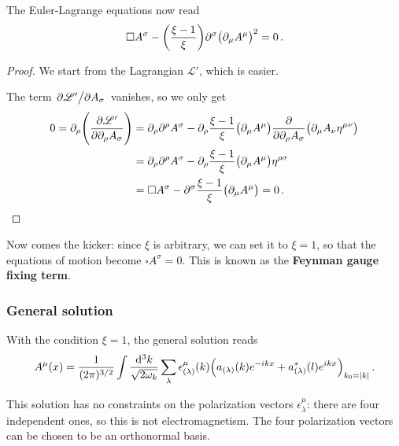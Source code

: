 \documentclass[main.tex]{subfiles}
\begin{document}
\begin{claim}
The Euler-Lagrange equations now read 
%
\begin{align}
\square A^{\sigma } - \qty(\frac{\xi -1}{\xi }) \partial^{\sigma }
\qty(\partial_{\mu } A^{ \mu })^2 = 0
\,.
\end{align}
\end{claim}

\begin{proof}
We start from the Lagrangian \(\mathscr{L}'\), which is easier. 

The term \(\pdv*{\mathscr{L}'}{A_{\sigma }}\) vanishes, so we only get 
%
\begin{align}
0=\partial_{\rho } \qty(\pdv{\mathscr{L}'}{\partial_{\rho } A_{\sigma }}) 
&= \partial_{\rho } \partial^{\rho } A^{\sigma } - \partial_{\rho } 
\frac{\xi - 1}{\xi } \qty(\partial_{\mu } A^{\mu }) \pdv{}{\partial_{\rho } A_{\sigma }} \qty(\partial_{\mu } A_{\nu } \eta^{\mu \nu })  \\
&= \partial_{\rho } \partial^{\rho } A^{\sigma } - \partial_{\rho } 
\frac{\xi - 1}{\xi } \qty(\partial_{\mu } A^{\mu }) \eta^{\rho \sigma }  \\
&= \square A^{\sigma } - \partial^{\sigma } 
\frac{\xi - 1}{\xi } \qty(\partial_{\mu } A^{\mu }) =0
\,. 
\end{align}
\end{proof}

Now comes the kicker: since \(\xi \) is arbitrary, we can set it to \(\xi = 1\), so that the equations of motion become \(\square A^{\sigma } = 0\). This is known as the \textbf{Feynman gauge fixing term}.

\subsubsection{General solution}

With the condition \(\xi = 1\), the general solution reads 
%
\begin{align}
A^{\mu } (x) = \frac{1}{(2\pi )^{3/2}} \int \frac{ \dd[3]{k}}{\sqrt{2 \omega_{k}}} 
\sum _{\lambda } \epsilon^{\mu }_{(\lambda )}(k)
\qty(a_{(\lambda )}(k) e^{-ikx} + a^{*}_{(\lambda )} (l) e^{ikx})_{k_0 = \abs{k}}
\,.
\end{align}

This solution has no constraints on the polarization vectors \(\epsilon^{\mu }_{\lambda }\): there are four independent ones, so this is not electromagnetism. 
The four polarization vectors can be chosen to be an orthonormal basis. 
\end{document}
